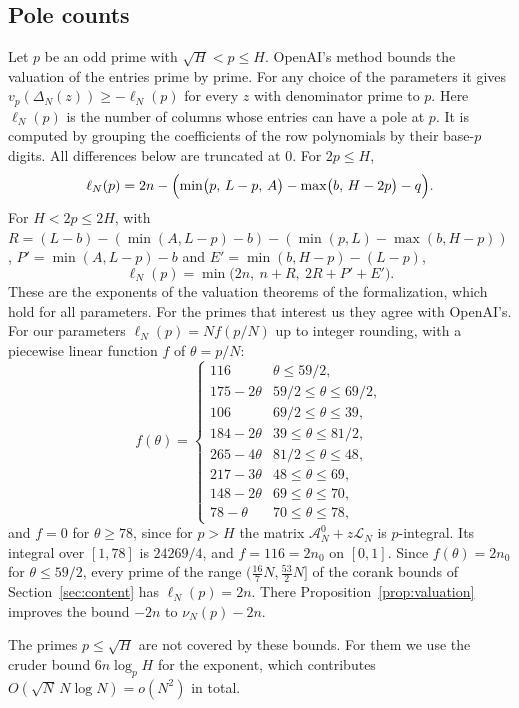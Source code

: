 \documentclass[11pt]{amsart}
\theoremstyle{definition}
\theoremstyle{remark}
\numberwithin{equation}{section}
\newcommand{\cA}{\mathcal A}
\newcommand{\cL}{\mathcal L}
\begin{document}
\subsection{Pole counts}
Let $p$ be an odd prime with $\sqrt H<p\le H$. OpenAI's method \cite[\S3]{OpenAI2026} bounds the valuation
of the entries prime by prime. For any choice of the parameters it gives $v_p(\Delta_N(z))\ge-\ell_N(p)$
for every $z$ with denominator prime to $p$. Here $\ell_N(p)$ is the number of columns whose entries can
have a pole at $p$. It is computed by grouping the coefficients of the row polynomials by their base-$p$
digits. All differences below are truncated at $0$. For $2p\le H$,
\[
 \ell_N(p)=2n-\Bigl(\min\bigl(p,\,L-p,\,A\bigr)-\max\bigl(b,\,H-2p\bigr)-q\Bigr).
\]
For $H<2p\le2H$, with $R=(L-b)-(\min(A,L-p)-b)-(\min(p,L)-\max(b,H-p))$, $P'=\min(A,L-p)-b$ and
$E'=\min(b,H-p)-(L-p)$,
\[
 \ell_N(p)=\min\bigl(2n,\ n+R,\ 2R+P'+E'\bigr).
\]
These are the exponents of the valuation theorems of the formalization, which hold for all parameters. For
the primes that interest us they agree with OpenAI's. For our parameters $\ell_N(p)=Nf(p/N)$ up to integer
rounding, with a piecewise linear function $f$ of $\theta=p/N$:
\[
 f(\theta)=\begin{cases}
 116&\theta\le59/2,\\
 175-2\theta&59/2\le \theta\le69/2,\\
 106&69/2\le \theta\le39,\\
 184-2\theta&39\le \theta\le81/2,\\
 265-4\theta&81/2\le \theta\le48,\\
 217-3\theta&48\le \theta\le69,\\
 148-2\theta&69\le \theta\le70,\\
 78-\theta&70\le \theta\le78,
 \end{cases}
\]
and $f=0$ for $\theta\ge78$, since for $p>H$ the matrix $\cA^0_N+z\cL_N$ is $p$-integral. Its integral over
$[1,78]$ is $24269/4$, and $f=116=2n_0$ on $[0,1]$. Since $f(\theta)=2n_0$ for $\theta\le59/2$, every prime of
the range $(\frac{16}7N,\frac{53}2N]$ of the corank bounds of Section~\ref{sec:content} has
$\ell_N(p)=2n$. There Proposition~\ref{prop:valuation} improves the bound $-2n$ to $\nu_N(p)-2n$.

The primes $p\le\sqrt H$ are not covered by these bounds. For them we use the cruder bound $6n\log_pH$ for
the exponent, which contributes $O(\sqrt N\,N\log N)=o(N^2)$ in total.
\end{document}
